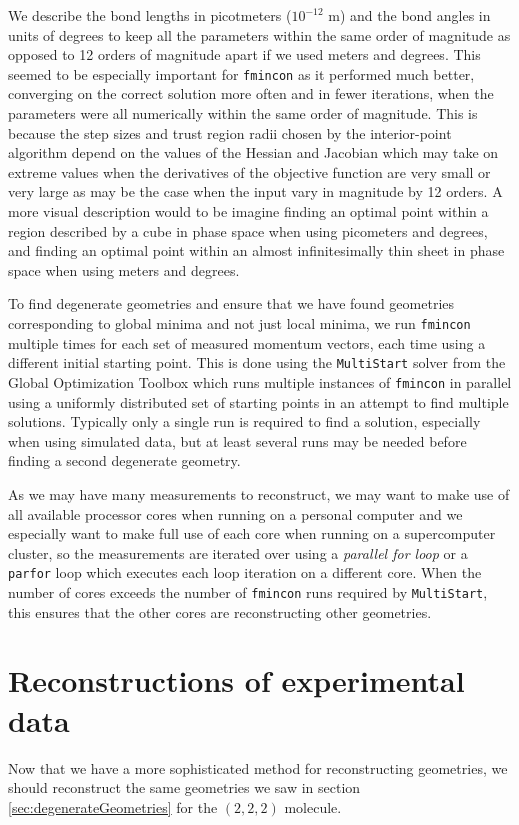 We describe the bond lengths in picotmeters ($10^{-12}$ m) and the bond angles in units of degrees to keep all the parameters within the same order of magnitude as opposed to 12 orders of magnitude apart if we used meters and degrees. This seemed to be especially important for \texttt{fmincon} as it performed much better, converging on the correct solution more often and in fewer iterations, when the parameters were all numerically within the same order of magnitude. This is because the step sizes and trust region radii chosen by the interior-point algorithm depend on the values of the Hessian and Jacobian which may take on extreme values when the derivatives of the objective function are very small or very large as may be the case when the input vary in magnitude by 12 orders.  A more visual description would to be imagine finding an optimal point within a region described by a cube in phase space when using picometers and degrees, and finding an optimal point within an almost infinitesimally thin sheet in phase space when using meters and degrees.

To find degenerate geometries and ensure that we have found geometries corresponding to global minima and not just local minima, we run \texttt{fmincon} multiple times for each set of measured momentum vectors, each time using a different initial starting point. This is done using the \texttt{MultiStart} solver from the Global Optimization Toolbox which runs multiple instances of \texttt{fmincon} in parallel using a uniformly distributed set of starting points in an attempt to find multiple solutions. Typically only a single run is required to find a solution, especially when using simulated data, but at least several runs may be needed before finding a second degenerate geometry.

As we may have many measurements to reconstruct, we may want to make use of all available processor cores when running on a personal computer and we especially want to make full use of each core when running on a supercomputer cluster, so the measurements are iterated over using a \emph{parallel for loop} or a \texttt{parfor} loop which executes each loop iteration on a different core. When the number of cores exceeds the number of \texttt{fmincon} runs required by \texttt{MultiStart}, this ensures that the other cores are reconstructing other geometries.

\section{Reconstructions of experimental data}
Now that we have a more sophisticated method for reconstructing geometries, we should reconstruct the same geometries we saw in section \ref{sec:degenerateGeometries} for the  $(2,2,2)$ molecule.

